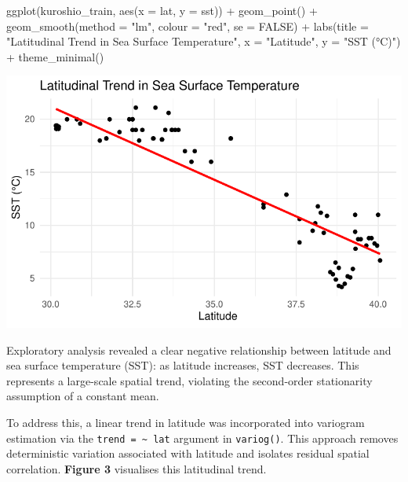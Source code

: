 \documentclass[
  11pt,
]{article}
\newenvironment{Shaded}{\begin{snugshade}}{\end{snugshade}}
\newcommand{\AttributeTok}[1]{\textcolor[rgb]{0.40,0.45,0.13}{#1}}
\newcommand{\ConstantTok}[1]{\textcolor[rgb]{0.56,0.35,0.01}{#1}}
\newcommand{\FunctionTok}[1]{\textcolor[rgb]{0.28,0.35,0.67}{#1}}
\newcommand{\NormalTok}[1]{\textcolor[rgb]{0.00,0.23,0.31}{#1}}
\newcommand{\SpecialCharTok}[1]{\textcolor[rgb]{0.37,0.37,0.37}{#1}}
\newcommand{\StringTok}[1]{\textcolor[rgb]{0.13,0.47,0.30}{#1}}
\begin{document}
\begin{Shaded}
\begin{Highlighting}[]
\FunctionTok{ggplot}\NormalTok{(kuroshio\_train, }\FunctionTok{aes}\NormalTok{(}\AttributeTok{x =}\NormalTok{ lat, }\AttributeTok{y =}\NormalTok{ sst)) }\SpecialCharTok{+}   
  \FunctionTok{geom\_point}\NormalTok{() }\SpecialCharTok{+}   \FunctionTok{geom\_smooth}\NormalTok{(}\AttributeTok{method =} \StringTok{"lm"}\NormalTok{, }\AttributeTok{colour =} \StringTok{"red"}\NormalTok{, }\AttributeTok{se =} \ConstantTok{FALSE}\NormalTok{) }\SpecialCharTok{+}   
  \FunctionTok{labs}\NormalTok{(}\AttributeTok{title =} \StringTok{"Latitudinal Trend in Sea Surface Temperature"}\NormalTok{,        }\AttributeTok{x =} \StringTok{"Latitude"}\NormalTok{, }\AttributeTok{y =} \StringTok{"SST (°C)"}\NormalTok{) }\SpecialCharTok{+}   
  \FunctionTok{theme\_minimal}\NormalTok{()}
\end{Highlighting}
\end{Shaded}

\includegraphics{project_files/figure-pdf/unnamed-chunk-7-1.pdf}

Exploratory analysis revealed a clear negative relationship between
latitude and sea surface temperature (SST): as latitude increases, SST
decreases. This represents a large-scale spatial trend, violating the
second-order stationarity assumption of a constant mean.

To address this, a linear trend in latitude was incorporated into
variogram estimation via the \texttt{trend\ =\ \textasciitilde{}\ lat}
argument in \texttt{variog()}. This approach removes deterministic
variation associated with latitude and isolates residual spatial
correlation. \textbf{Figure 3} visualises this latitudinal trend.
\end{document}
